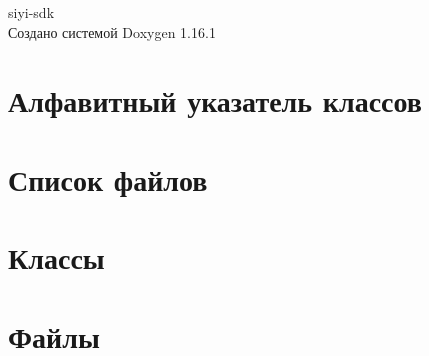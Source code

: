 \documentclass[twoside]{book}
\newcommand{\+}{\discretionary{\mbox{\scriptsize$\hookleftarrow$}}{}{}}
\newcommand{\clearemptydoublepage}{%
    \newpage{\pagestyle{empty}\cleardoublepage}%
  }
\begin{document}
  \raggedbottom
    \hypersetup{pageanchor=false,
                bookmarksnumbered=true,
                pdfencoding=unicode
               }
  \begin{titlepage}
  \vspace*{7cm}
  \begin{center}%
  {\Large siyi-\/sdk}\\
  \vspace*{1cm}
  {\large Создано системой Doxygen 1.16.1}\\
  \end{center}
  \end{titlepage}
  \clearemptydoublepage
  \tableofcontents
  \clearemptydoublepage
  \hypersetup{pageanchor=true}
\chapter{Алфавитный указатель классов}

\chapter{Список файлов}

\chapter{Классы}






























\chapter{Файлы}




  \backmatter
  \newpage
  \clearemptydoublepage
  \printindex
\end{document}
